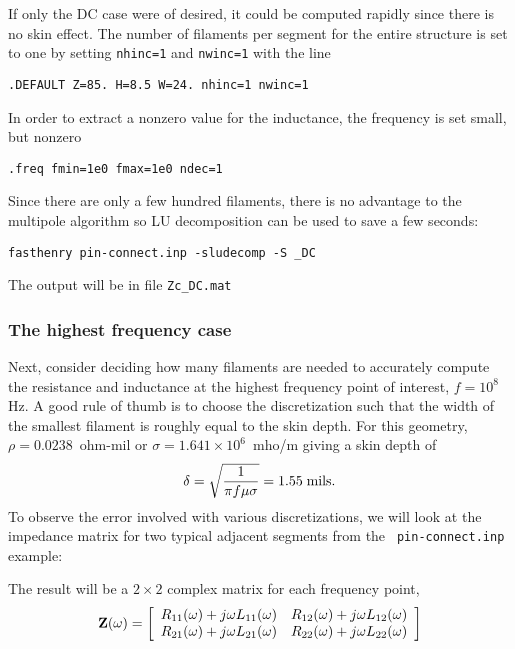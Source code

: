 If only the DC case were of desired, it could be computed rapidly
since there is no skin effect.  The number of filaments per segment
for the entire structure is set to one by setting {\tt nhinc=1} and
{\tt nwinc=1} with the line
\begin{verbatim}
.DEFAULT Z=85. H=8.5 W=24. nhinc=1 nwinc=1
\end{verbatim}

In order to extract a nonzero value for the inductance, the frequency
is set small, but nonzero
\begin{verbatim}
.freq fmin=1e0 fmax=1e0 ndec=1
\end{verbatim}

Since there are only a few hundred filaments, there is no advantage to
the multipole algorithm so LU decomposition can be used to save a few
seconds:
\begin{verbatim}
fasthenry pin-connect.inp -sludecomp -S _DC
\end{verbatim}
The output will be in file {\tt Zc\_DC.mat}

\subsubsection{The highest frequency case}

Next, consider deciding how many filaments are needed to accurately
compute the resistance and inductance at the highest frequency point
of interest, $f = 10^8$ Hz.  A good rule of thumb is to choose the
discretization such that the width of the smallest filament is roughly
equal to the skin depth.  For this geometry,  $\rho = 0.0238$~ohm-mil
or $\sigma = 1.641 \times 10^6$~mho/m 
giving a skin depth of
\begin{equation}
 \delta = \sqrt{\frac{1}{\pi f \mu \sigma}} = 1.55\; {\rm mils}.
\end{equation}
To observe the error involved with various discretizations, we will
look at the impedance matrix for two typical adjacent segments from the {\tt
pin-connect.inp} example:

\vspace{0.3in}

The result will be a $2 \times 2$ complex matrix for each frequency point,
\begin{equation}
{\bf Z}(\omega) = \left[ 
\begin{array}{cc}
  R_{11}(\omega) + j\omega L_{11}(\omega) &  R_{12}(\omega) + j\omega L_{12}(\omega)  \\
  R_{21}(\omega) + j\omega L_{21}(\omega) &  R_{22} (\omega) + j\omega L_{22}(\omega) 
\end{array}
\right]
\end{equation}

